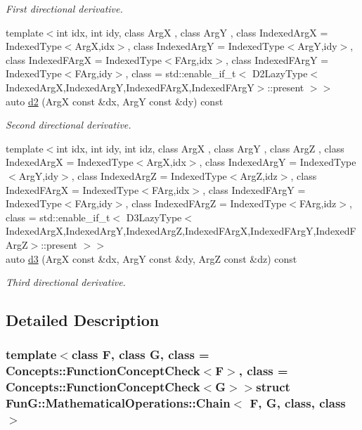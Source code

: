 \begin{DoxyCompactItemize}
\begin{DoxyCompactList}\small\item\em First directional derivative. \end{DoxyCompactList}\item 
{\footnotesize template$<$int idx, int idy, class Arg\+X , class Arg\+Y , class Indexed\+Arg\+X  = Indexed\+Type$<$\+Arg\+X,idx$>$, class Indexed\+Arg\+Y  = Indexed\+Type$<$\+Arg\+Y,idy$>$, class Indexed\+F\+Arg\+X  = Indexed\+Type$<$\+F\+Arg,idx$>$, class Indexed\+F\+Arg\+Y  = Indexed\+Type$<$\+F\+Arg,idy$>$, class  = std\+::enable\+\_\+if\+\_\+t$<$ D2\+Lazy\+Type$<$\+Indexed\+Arg\+X,\+Indexed\+Arg\+Y,\+Indexed\+F\+Arg\+X,\+Indexed\+F\+Arg\+Y$>$\+::present $>$$>$ }\\auto \hyperlink{structFunG_1_1MathematicalOperations_1_1Chain_a0ab88c09299ce967583408f7f7dcd2bb}{d2} (Arg\+X const \&dx, Arg\+Y const \&dy) const 
\begin{DoxyCompactList}\small\item\em Second directional derivative. \end{DoxyCompactList}\item 
{\footnotesize template$<$int idx, int idy, int idz, class Arg\+X , class Arg\+Y , class Arg\+Z , class Indexed\+Arg\+X  = Indexed\+Type$<$\+Arg\+X,idx$>$, class Indexed\+Arg\+Y  = Indexed\+Type$<$\+Arg\+Y,idy$>$, class Indexed\+Arg\+Z  = Indexed\+Type$<$\+Arg\+Z,idz$>$, class Indexed\+F\+Arg\+X  = Indexed\+Type$<$\+F\+Arg,idx$>$, class Indexed\+F\+Arg\+Y  = Indexed\+Type$<$\+F\+Arg,idy$>$, class Indexed\+F\+Arg\+Z  = Indexed\+Type$<$\+F\+Arg,idz$>$, class  = std\+::enable\+\_\+if\+\_\+t$<$ D3\+Lazy\+Type$<$\+Indexed\+Arg\+X,\+Indexed\+Arg\+Y,\+Indexed\+Arg\+Z,\+Indexed\+F\+Arg\+X,\+Indexed\+F\+Arg\+Y,\+Indexed\+F\+Arg\+Z$>$\+::present $>$$>$ }\\auto \hyperlink{structFunG_1_1MathematicalOperations_1_1Chain_a17ac1618545b9d9bd2efa873b36cfbc7}{d3} (Arg\+X const \&dx, Arg\+Y const \&dy, Arg\+Z const \&dz) const 
\begin{DoxyCompactList}\small\item\em Third directional derivative. \end{DoxyCompactList}\end{DoxyCompactItemize}


\subsection{Detailed Description}
\subsubsection*{template$<$class F, class G, class = Concepts\+::\+Function\+Concept\+Check$<$\+F$>$, class = Concepts\+::\+Function\+Concept\+Check$<$\+G$>$$>$struct Fun\+G\+::\+Mathematical\+Operations\+::\+Chain$<$ F, G, class, class $>$}

